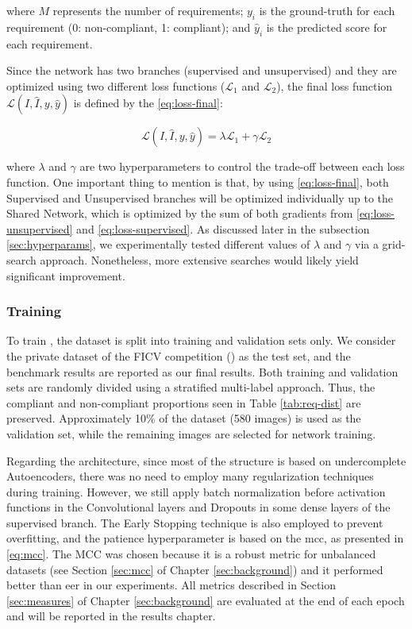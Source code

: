 \noindent where $M$ represents the number of requirements; $y_i$ is the ground-truth for each requirement (0: non-compliant, 1: compliant); and $\hat{y}_i$ is the predicted score for each requirement.

Since the network has two branches (supervised and unsupervised) and they are optimized using two different loss functions ($\mathcal{L}_1$ and $\mathcal{L}_2$), the final loss function $\mathcal{L}(I, \hat{I}, y, \hat{y})$ is defined by the \autoref{eq:loss-final}:

\begin{equation}
\label{eq:loss-final}
\mathcal{L}(I, \hat{I}, y, \hat{y}) = \lambda\mathcal{L}_1 + \gamma\mathcal{L}_2
\end{equation}

\noindent where $\lambda$ and $\gamma$ are two hyperparameters to control the trade-off between each loss function. One important thing to mention is that, by using \autoref{eq:loss-final}, both Supervised and Unsupervised branches will be optimized individually up to the Shared Network, which is optimized by the sum of both gradients from \autoref{eq:loss-unsupervised} and \autoref{eq:loss-supervised}. As discussed later in the subsection \ref{sec:hyperparams}, we experimentally tested different values of $\lambda$ and $\gamma$ via a grid-search approach. Nonetheless, more extensive searches would likely yield significant improvement.

\subsubsection{Training} 

To train \methodname, the \adhoc dataset is split into training and validation sets only. We consider the private dataset of the FICV competition (\ficvofficial) as the test set, and the benchmark results are reported as our final results. Both training and validation sets are randomly divided using a stratified multi-label approach. Thus, the compliant and non-compliant proportions seen in Table \ref{tab:req-dist} are preserved. Approximately 10\% of the dataset (580 images) is used as the validation set, while the remaining images are selected for network training.

Regarding the architecture, since most of the \methodname structure is based on undercomplete Autoencoders, there was no need to employ many regularization techniques during training. However, we still apply batch normalization before activation functions in the Convolutional layers and Dropouts in some dense layers of the supervised branch. The Early Stopping technique is also employed to prevent overfitting, and the patience hyperparameter is based on the \acf{mcc}, as presented in \autoref{eq:mcc}. The MCC was chosen because it is a robust metric for unbalanced datasets (see Section \ref{sec:mcc} of Chapter \ref{sec:background}) and it performed better than \acs{eer} in our experiments. All metrics described in Section \ref{sec:measures} of Chapter \ref{sec:background} are evaluated at the end of each epoch and will be reported in the results chapter.


